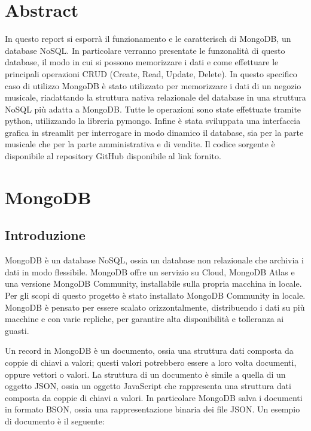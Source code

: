 \documentclass{article}
\begin{document}


\tableofcontents
\newpage

\section*{Abstract}

In questo report si esporrà il funzionamento e le caratterisch di MongoDB, un database NoSQL. In particolare verranno presentate le funzonalità di questo database,
il modo in cui si possono memorizzare i dati e come effettuare le principali operazioni CRUD (Create, Read, Update, Delete). 
In questo specifico caso di utilizzo MongoDB è stato utilizzato per memorizzare i dati di un 
negozio musicale, riadattando la struttura nativa relazionale del database in una struttura NoSQL più
adatta a MongoDB. Tutte le operazioni sono state effettuate tramite python, utilizzando la libreria pymongo.
Infine è stata sviluppata una interfaccia grafica in streamlit per interrogare in modo dinamico il database,
sia per la parte musicale che per la parte amministrativa e di vendite. Il codice sorgente è disponibile
al repository GitHub disponibile al link fornito.



\section{MongoDB}

\subsection{Introduzione}

MongoDB è un database NoSQL, ossia un database non relazionale che archivia i dati in modo flessibile. MongoDB offre un servizio su Cloud, MongoDB Atlas
e una versione MongoDB Community, installabile sulla propria macchina in locale. Per gli scopi di questo progetto è stato installato
MongoDB Community in locale. MongoDB è pensato per essere scalato orizzontalmente, distribuendo i dati su più macchine e con varie repliche, per garantire
alta disponibilità e tolleranza ai guasti. 

Un record in MongoDB è un documento, ossia una struttura dati composta da coppie di chiavi a valori; questi valori potrebbero 
essere a loro volta documenti, oppure vettori o valori. La struttura di un documento è simile a quella di un oggetto JSON,
ossia un oggetto JavaScript che rappresenta una struttura dati composta da coppie di chiavi a valori. In particolare MongoDB salva i documenti in formato BSON, ossia una rappresentazione binaria dei file JSON. 
Un esempio di documento è il seguente:
\end{document}
